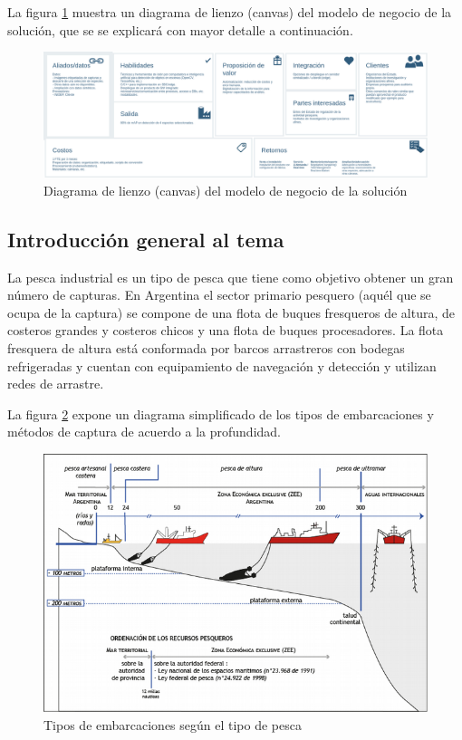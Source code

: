 \documentclass[11pt]{charter}
\begin{document}
La figura  \ref{fig:canvas} muestra un diagrama de lienzo (canvas) del modelo de negocio de la solución, que se se explicará con mayor detalle a continuación.

\vspace{25px}

\begin{figure}[htpb]
\centering 
\includegraphics[width=1\textwidth]{./Figuras/canvas.png}
\caption{Diagrama de lienzo (canvas) del modelo de negocio de la solución}
\label{fig:canvas}
\end{figure}

\vspace{25px}

\subsection{Introducción general al tema}

La pesca industrial es un tipo de pesca que tiene como objetivo obtener un gran número de capturas. En Argentina el sector primario pesquero (aquél que se ocupa de la captura) se compone de una flota de buques fresqueros de altura, de costeros grandes y costeros chicos y una flota de buques procesadores. La flota fresquera de altura está conformada por barcos arrastreros con bodegas refrigeradas y cuentan con equipamiento de navegación y detección y utilizan redes de arrastre.

La figura \ref{fig:tipo_embarcaciones} expone un diagrama simplificado de los tipos de embarcaciones y métodos de captura de acuerdo a la profundidad.

\vspace{25px}

\begin{figure}[htpb]
\centering 
\includegraphics[width=.7\textwidth]{./Figuras/tipo_embarcaciones.png}
\caption{Tipos de embarcaciones según el tipo de pesca}
\label{fig:tipo_embarcaciones}
\end{figure}
\end{document}
